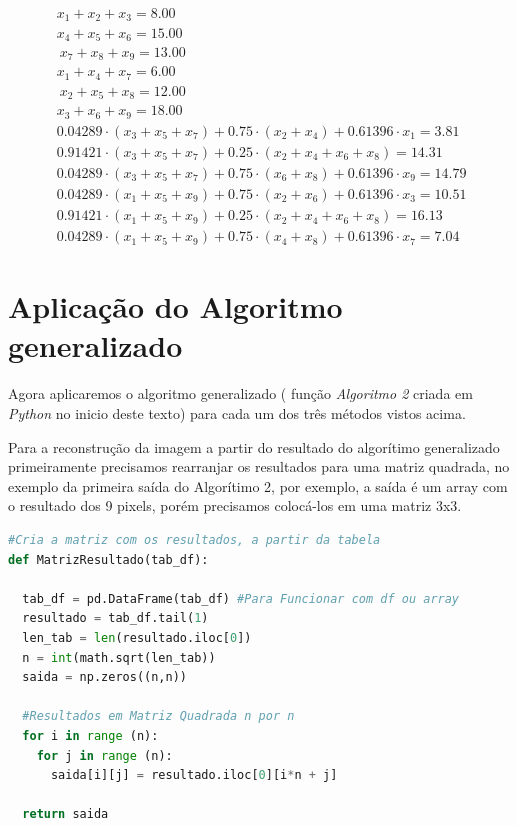 \documentclass[a4paper, 12pt]{article}
\begin{document}
$$\boxed{\ \ \begin{matrix}
x_1+x_2+x_3=8.00\\
x_4+x_5+x_6=15.00\\
\ x_7+x_8+x_9=13.00\\
x_1+x_4+x_7=6.00\\
\ x_2+x_5+x_8=12.00\\
x_3+x_6+x_9=18.00\\
0.04289\cdot \left(x_3+x_5+x_7\right)+0.75\cdot \left(x_2+x_4\right)+0.61396\cdot x_1=3.81\\
0.91421\cdot \left(x_3+x_5+x_7\right)+0.25\cdot \left(x_2+x_4+x_6+x_8\right)=14.31\\
0.04289\cdot \left(x_3+x_5+x_7\right)+0.75\cdot \left(x_6+x_8\right)+0.61396\cdot x_9=14.79\\
0.04289\cdot \left(x_1+x_5+x_9\right)+0.75\cdot \left(x_2+x_6\right)+0.61396\cdot x_3=10.51\\
0.91421\cdot \left(x_1+x_5+x_9\right)+0.25\cdot \left(x_2+x_4+x_6+x_8\right)=16.13\\
0.04289\cdot \left(x_1+x_5+x_9\right)+0.75\cdot \left(x_4+x_8\right)+0.61396\cdot x_7=7.04
\end{matrix}\ }$$

\section{Aplicação do Algoritmo generalizado}

Agora aplicaremos o algoritmo generalizado ( função \textit{Algoritmo 2} criada em \textit{Python} no inicio deste texto) para cada um dos três métodos vistos acima.

Para a reconstrução da imagem a partir do resultado do algorítimo generalizado primeiramente precisamos rearranjar os resultados para uma matriz quadrada, no exemplo da primeira saída do Algorítimo 2, por exemplo, a saída é um array com o resultado dos 9 pixels, porém precisamos colocá-los em uma matriz 3x3.

\begin{lstlisting}[language=Python, caption=Matriz Resultado, label=MatrizResultado]
#Cria a matriz com os resultados, a partir da tabela
def MatrizResultado(tab_df):
  
  tab_df = pd.DataFrame(tab_df) #Para Funcionar com df ou array
  resultado = tab_df.tail(1)
  len_tab = len(resultado.iloc[0])
  n = int(math.sqrt(len_tab))
  saida = np.zeros((n,n))

  #Resultados em Matriz Quadrada n por n
  for i in range (n):
    for j in range (n):
      saida[i][j] = resultado.iloc[0][i*n + j]

  return saida
\end{lstlisting}
\end{document}

